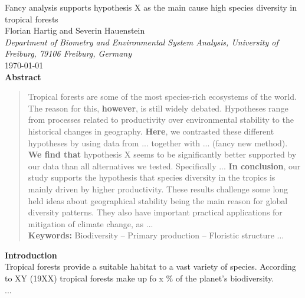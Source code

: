\documentclass{tufte-book}
\begin{document}
\begin{center}
	\huge{Fancy analysis supports hypothesis X as the main cause high species diversity in tropical forests} \\ 
	\vspace{0.3em}
	\large{Florian Hartig and Severin Hauenstein}\\
	\vspace{0.3em}
	\small{\textit{Department of Biometry and Environmental System Analysis, University of Freiburg, 79106 Freiburg, Germany}}\\
	\vspace{1em}
	\large{\today}\\
	\vspace{2em}
	\textbf{Abstract}\\ 
\end{center}
\begin{quote}
Tropical forests are some of the most species-rich ecosystems of the world.
The reason for this, \textbf{however}, is still widely debated. Hypotheses range from processes related to productivity over environmental stability to the historical changes in geography.
\textbf{Here}, we contrasted these different hypotheses by using data from ... together with ... (fancy new method).
\textbf{We find that} hypothesis X seems to be significantly better supported by our data
than all alternatives we tested. Specifically ... 
\textbf{In conclusion}, our study supports the hypothesis that species diversity in the
tropics is mainly driven by higher productivity. These results challenge some long held
ideas about geographical stability being the main reason for global diversity
patterns. They also have important practical applications for mitigation of climate
change, as ...\\[0.3cm]
\noindent\textbf{Keywords:} Biodiversity -- Primary production -- Floristic structure ...\\
\end{quote}

\noindent\textbf{Introduction}\\
Tropical forests provide a suitable habitat to a vast variety of species. According to XY (19XX) tropical forests make up fo x \% of the planet's biodiversity.\\
...
\end{document}
